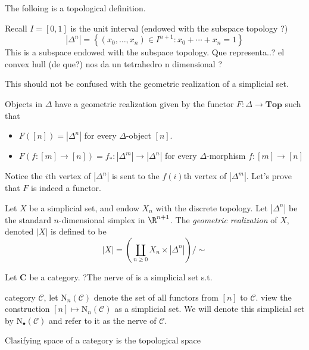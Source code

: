 
The folloing is a topological definition.
\begin{definition}
    Recall \(I = [0,1]\) is the unit interval (endowed with the subspace topology ?)
    \[|{\Delta}^n| = \left\{ (x_0, \dots, x_n)\in I^{n+1 } :  x_0 + \cdots + x_n = 1 \right\}\]
    This is a subspace endowed with the subspace topology.
    Que representa..? el convex hull (de que?)
    nos da un tetrahedro n dimensional ?
\end{definition}
\begin{remark}
    This should not be confused with the geometric realization of a simplicial set.
\end{remark}


Objects in \(\Delta\) have a geometric realization given by the  functor \(F\colon \Delta \to \mathbf{Top}\) such that 
\begin{itemize}
    \item \(F([n]) = |\Delta^n|\) for every \(\Delta\)-object \([n]\).
    \item \(F(f\colon [m] \to [n]) = f_*\colon |\Delta^m| \to |\Delta^n| \) for every \(\Delta\)-morphism \(f\colon [m]\to [n]\)
\end{itemize} 
Notice the \(i\)th vertex of \(|\Delta^n|\) is sent to the \(f(i)\)th vertex of \(|\Delta^m|\). 
Let's prove that \(F\) is indeed a functor.



\begin{definition}[Realization]
    Let \(X\) be a simplicial set, and endow \(X_n\) with the discrete topology.
    Let \(|\Delta^n|\) be the standard \(n\)-dimensional simplex in \(\R^{n+1}\).
    The \textit{geometric realization} of \(X\), denoted \(|X|\) is defined to be 
    \[|X| = \left( \coprod_{n\geq 0}  X_n \times  |\Delta^n| \right)/ \sim\]

\end{definition}





\begin{definition}
    Let \(\mathbf{C}\) be a category. ?The nerve of is a simplicial set s.t.

    category \(\mathcal{C}\),  let \(\mathrm{N}_n(\mathcal{C})\) denote the set of all functors from \([n]\) to \(\mathcal{C}\). view the construction \([n] \mapsto \mathrm{N}_n(\mathcal{C})\) as a simplicial set. We will denote this simplicial set by \(\mathrm{N}_{\bullet}(\mathcal{C})\) and refer to it as the nerve of \(\mathcal{C}\).
\end{definition}



Clasifying space of a category is the topological space











